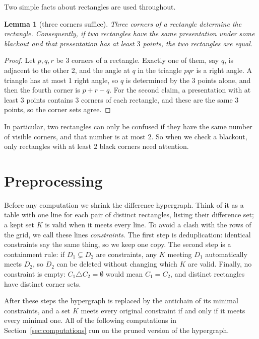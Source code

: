 \documentclass[12pt]{article}
\newtheorem{lemma}{Lemma}
\theoremstyle{definition}\newtheorem{definition}{Definition}
\theoremstyle{remark}\newtheorem{remark}{Remark}
\begin{document}
Two simple facts about rectangles are used throughout.

\begin{lemma}[three corners suffice]\label{lem:threecorners}
Three corners of a rectangle determine the rectangle. Consequently, if two
rectangles have the same presentation under some blackout and that presentation
has at least $3$ points, the two rectangles are equal.
\end{lemma}
\begin{proof}
Let $p,q,r$ be 3 corners of a rectangle. Exactly one of them, say $q$, is
adjacent to the other 2, and the angle at $q$ in the triangle $pqr$ is a right
angle. A triangle has at most 1 right angle, so $q$ is determined by the 3
points alone, and then the fourth corner is $p+r-q$. For the second claim, a
presentation with at least $3$ points contains $3$ corners of each rectangle,
and these are the same $3$ points, so the corner sets agree.
\end{proof}

In particular, two rectangles can only be confused if they have the same
number of visible corners, and that number is at most $2$. So when we check a
blackout, only rectangles with at least $2$ black corners need attention.

\section{Preprocessing}\label{sec:preprocessing}
Before any computation we shrink the difference hypergraph. Think of it as a
table with one line for each pair of distinct rectangles, listing their
difference set; a kept set $K$ is valid when it meets every line. To avoid a
clash with the rows of the grid, we call these lines \emph{constraints}.
The first step is deduplication: identical constraints say the same thing, so
we keep one copy. The second step is a containment rule: if $D_1\subsetneq D_2$
are constraints, any $K$ meeting $D_1$ automatically meets $D_2$, so $D_2$ can be
deleted without changing which $K$ are valid. Finally, no constraint is empty:
$C_1\triangle C_2=\emptyset$ would mean $C_1=C_2$, and distinct rectangles have
distinct corner sets.

After these steps the hypergraph is replaced by the antichain of its minimal
constraints, and a set $K$ meets every original constraint if and only if it
meets every minimal one. All of the following computations in Section~\ref{sec:computations} run on the pruned version of the hypergraph.
\end{document}
